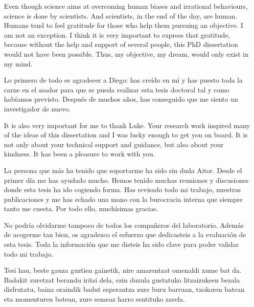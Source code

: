 


\begin{acknowledgements}      
Even though science aims at overcoming human biases and irrational behaviours, science is done by scientists. And scientists, in the end of the day, are human. Humans tend to feel gratitude for those who help them pursuing an objective. I am not an exception. I think it is very important to express that gratitude, because without the help and support of several people, this PhD dissertation would not have been possible. Thus, my objective, my dream, would only exist in my mind.

Lo primero de todo es agradecer a Diego: has creído en mí y has puesto toda la carne en el asador para que se pueda realizar esta tesis doctoral tal y como habíamos previsto. Después de muchos años, has conseguido que me sienta un investigador de nuevo. 

It is also very important for me to thank Luke. Your research work inspired many of the ideas of this dissertation and I was lucky enough to get you on board. It is not only about your technical support and guidance, but also about your kindness. It has been a pleasure to work with you.

La persona que más ha tenido que soportarme ha sido sin duda Aitor. Desde el primer día me has ayudado mucho. Hemos tenido muchas reuniones y discusiones donde esta tesis ha ido cogiendo forma. Has revisado todo mi trabajo, nuestras publicaciones y me has echado una mano con la burocracia interna que siempre tanto me cuesta. Por todo ello, muchísimas gracias.

No podría olvidarme tampoco de todos los compañeros del laboratorio. Además de acogerme tan bien, os agradezco el esfuerzo que dedicasteis a la evaluación de esta tesis. Toda la información que me disteis ha sido clave para poder validar todo mi trabajo.

Tesi hau, beste gauza guztien gainetik, nire amarentzat omenaldi xume bat da. Badakit zuretzat berandu iritsi dela, ezin duzula gustatuko litzaizukeen bezala disfrutatu, baina oraindik badut esperantza zure buru barruan, txokoren batean eta momenturen batean, zure semeaz harro sentituko zarela.



\end{acknowledgements}
